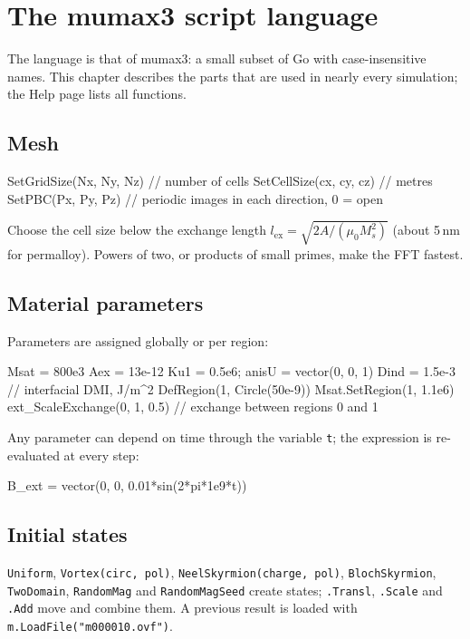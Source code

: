 \documentclass[11pt,a4paper,oneside]{book}
\newcommand{\code}[1]{\texttt{#1}}
\renewcommand{\_}{\textunderscore\allowbreak}
\begin{document}
\chapter{The mumax3 script language}\label{ch:mx3}

The language is that of mumax3: a small subset of Go with case-insensitive names. This chapter describes the
parts that are used in nearly every simulation; the Help page lists all functions.

\section{Mesh}
\begin{mxcode}
SetGridSize(Nx, Ny, Nz)      // number of cells
SetCellSize(cx, cy, cz)      // metres
SetPBC(Px, Py, Pz)           // periodic images in each direction, 0 = open
\end{mxcode}
Choose the cell size below the exchange length $l_\text{ex} = \sqrt{2A/(\mu_0 M_s^2)}$ (about 5\,nm for
permalloy). Powers of two, or products of small primes, make the FFT fastest.

\section{Material parameters}

Parameters are assigned globally or per region:
\begin{mxcode}
Msat = 800e3
Aex  = 13e-12
Ku1  = 0.5e6;  anisU = vector(0, 0, 1)
Dind = 1.5e-3                     // interfacial DMI, J/m^2
DefRegion(1, Circle(50e-9))
Msat.SetRegion(1, 1.1e6)
ext_ScaleExchange(0, 1, 0.5)      // exchange between regions 0 and 1
\end{mxcode}
Any parameter can depend on time through the variable \code{t}; the expression is re-evaluated at every step:
\begin{mxcode}
B_ext = vector(0, 0, 0.01*sin(2*pi*1e9*t))
\end{mxcode}

\section{Initial states}

\code{Uniform}, \code{Vortex(circ, pol)}, \code{NeelSkyrmion(charge, pol)}, \code{BlochSkyrmion},
\code{TwoDomain}, \code{RandomMag} and \code{RandomMagSeed} create states; \code{.Transl}, \code{.Scale} and
\code{.Add} move and combine them. A previous result is loaded with \code{m.LoadFile("m000010.ovf")}.
\end{document}
